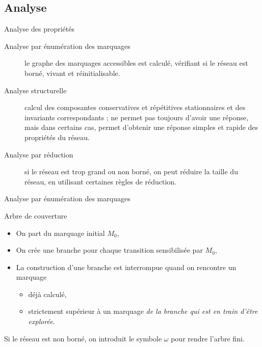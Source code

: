 \documentclass[compress]{beamer}
\begin{document}

\subsection{Analyse}
\begin{frame}{Analyse des propriétés}
\begin{description}
\item[Analyse par énumération des marquages] le graphe des marquages accessibles est calculé, vérifiant si le réseau est borné, vivant et réinitialisable.
\item[Analyse structurelle] calcul des composantes conservatives et répétitives stationnaires et des invariants correspondants ; ne permet pas toujours d'avoir une réponse, mais dans certains cas, permet d'obtenir une réponse simples et rapide des propriétés du réseau.
\item[Analyse par réduction] si le réseau est trop grand ou non borné, on peut réduire la taille du réseau, en utilisant certaines règles de réduction.
\end{description}
\end{frame}

\begin{frame}{Analyse par énumération des marquages}
\begin{block}{Arbre de couverture}
\begin{itemize}
\item On part du marquage initial $M_0$,
\item On crée une branche pour chaque transition sensibilisée par $M_0$,
\item La construction d'une branche est interrompue quand on rencontre un marquage
	\begin{itemize}
	\item déjà calculé,
	\item strictement supérieur à un marquage {\em de la branche qui est en train d'être explorée}.
	\end{itemize}
\end{itemize}  
Si le réseau est non borné, on introduit le symbole $\omega$ pour rendre l'arbre fini.
\end{block}
\end{frame}  
 
\end{document}
